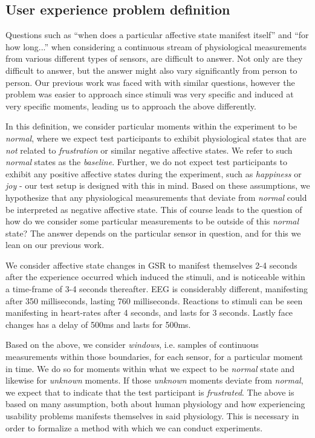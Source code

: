 \subsection{User experience problem definition}
Questions such as ``when does a particular affective state manifest itself'' and ``for how long...'' when considering a
continuous stream of physiological measurements from various different types of sensors, are difficult to answer. Not
only are they difficult to answer, but the answer might also vary significantly from person to person. Our previous work
was faced with with similar questions, however the problem was easier to approach since stimuli was very specific and
induced at very specific moments, leading us to approach the above differently.

In this definition, we consider particular moments within the experiment to be \textit{normal}, where we expect test
participants to exhibit physiological states that are \textit{not} related to \textit{frustration} or similar negative
affective states. We refer to such \textit{normal} states as the \textit{baseline}. Further, we do not expect test
participants to exhibit any positive affective states during the experiment, such as \textit{happiness} or \textit{joy}
- our test setup is designed with this in mind. Based on these assumptions, we hypothesize that any physiological
measurements that deviate from \textit{normal} could be interpreted as negative affective state. This of course leads to
the question of how do we consider some particular measurements to be outside of this \textit{normal} state? The answer
depends on the particular sensor in question, and for this we lean on our previous work.

We consider affective state changes in GSR to manifest themselves 2-4 seconds after the experience occurred which
induced the stimuli, and is noticeable within a time-frame of 3-4 seconds thereafter. EEG is considerably different,
manifesting after 350 milliseconds, lasting 760 milliseconds. Reactions to stimuli can be seen manifesting in heart-rates
after 4 seconds, and lasts for 3 seconds. Lastly face changes has a delay of 500ms and lasts for 500ms.

Based on the above, we consider \textit{windows}, i.e. samples of continuous measurements within those boundaries, for
each sensor, for a particular moment in time. We do so for moments within what we expect to be \textit{normal} state and
likewise for \textit{unknown} moments. If those \textit{unknown} moments deviate from \textit{normal}, we expect that to
indicate that the test participant is \textit{frustrated}. The above is based on many assumption, both about human
physiology and how experiencing usability problems manifests themselves in said physiology. This is necessary in order
to formalize a method with which we can conduct experiments.

